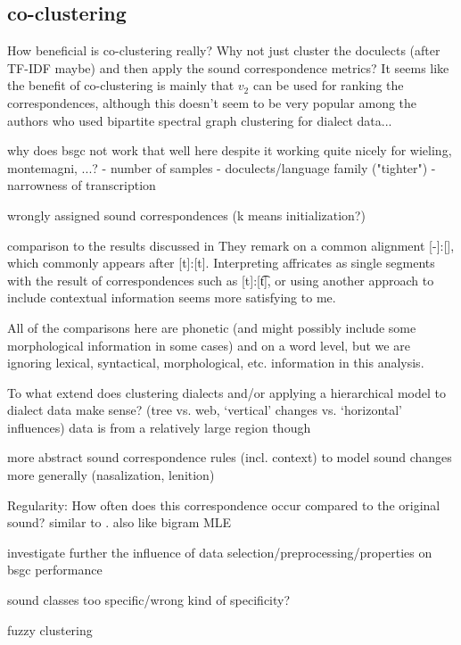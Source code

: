 \documentclass[a4paper]{article}
\begin{document}
\subsection{co-clustering}
How beneficial is co-clustering really? Why not just cluster the doculects (after TF-IDF maybe) and then apply the sound correspondence metrics? It seems like the benefit of co-clustering is mainly that $v_2$ can be used for ranking the correspondences, although this doesn't seem to be very popular among the authors who used bipartite spectral graph clustering for dialect data...

why does bsgc not work that well here despite it working quite nicely for wieling, montemagni, ...?
- number of samples
- doculects/language family ("tighter")
- narrowness of transcription

wrongly assigned sound correspondences (k means initialization?)

comparison to the results discussed in \citet{wieling2011bipartite}
They remark on a common alignment [-]:[\textesh], which commonly appears after [t]:[t]. Interpreting affricates as single segments with the result of correspondences such as [t]:[\t{t\textesh}], or using another approach to include contextual information seems more satisfying to me.


All of the comparisons here are phonetic (and might possibly include some morphological information in some cases) and on a word level, but we are ignoring lexical, syntactical, morphological, etc. information in this analysis.

To what extend does clustering dialects and/or applying a hierarchical model to dialect data make sense? (tree vs. web, `vertical' changes vs. `horizontal' influences)
data is from a relatively large region though

more abstract sound correspondence rules (incl. context) to model sound changes more generally (nasalization, lenition)

Regularity: How often does this correspondence occur compared to the original sound? similar to \citet{prokic2013combining}. also like bigram MLE

investigate further the influence of data selection/preprocessing/properties on bsgc performance

sound classes too specific/wrong kind of specificity?

fuzzy clustering

\newpage


\end{document}
